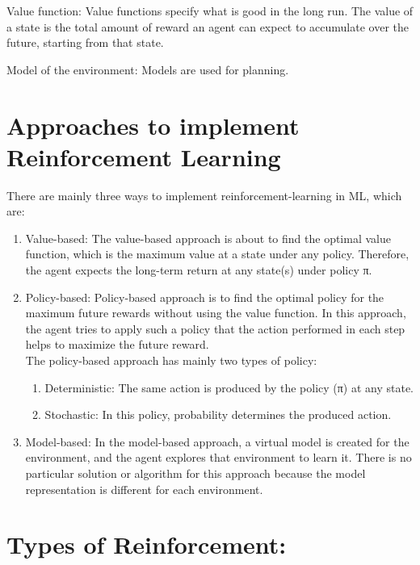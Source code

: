 \documentclass[12pt,a4paper]{report}
\begin{document}
Value function: Value functions specify what is good in the long run. The value of a state is the total amount of reward an agent can expect to accumulate over the future, starting from that state.

Model of the environment: Models are used for planning.

\section*{Approaches to implement Reinforcement Learning}
There are mainly three ways to implement reinforcement-learning in ML, which are:
\begin{enumerate}
\item Value-based:
The value-based approach is about to find the optimal value function, which is the maximum value at a state under any policy. Therefore, the agent expects the long-term return at any state(s) under policy π.
\item Policy-based:
Policy-based approach is to find the optimal policy for the maximum future rewards without using the value function. In this approach, the agent tries to apply such a policy that the action performed in each step helps to maximize the future reward.\\
The policy-based approach has mainly two types of policy:
\begin{enumerate}
\item Deterministic: The same action is produced by the policy (π) at any state.
\item Stochastic: In this policy, probability determines the produced action.
\end{enumerate}
\item Model-based: In the model-based approach, a virtual model is created for the environment, and the agent explores that environment to learn it. There is no particular solution or algorithm for this approach because the model representation is different for each environment.
\end{enumerate}

\section*{Types of Reinforcement:} 
\end{document}
